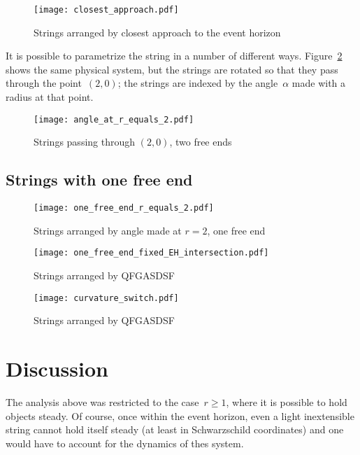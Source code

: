 \documentclass[prb,preprint]{revtex4-1}
\begin{document}
\begin{figure}[h!]
\centering
\texttt{[image: closest\_approach.pdf]}
\caption{Strings arranged by closest approach to the event horizon}
\label{closest_approach}
\end{figure}

It is possible to parametrize the string in a number of different
ways.  Figure~\ref{angle_at_r_equals_2} shows the same physical
system, but the strings are rotated so that they pass through the
point~$\left(2,0\right)$; the strings are indexed by the
angle~$\alpha$ made with a radius at that point.  

\begin{figure}[h!]
\centering
\texttt{[image: angle\_at\_r\_equals\_2.pdf]}
\caption{Strings \label{angle_at_r_equals_2} passing through $\left(2,0\right)$, two free ends}
\end{figure}

\subsection{Strings with one free end}


\begin{figure}[h!]
\centering
\texttt{[image: one\_free\_end\_r\_equals\_2.pdf]}
\caption{Strings arranged by angle made at $r=2$, one free end}
\label{y}
\end{figure}

\begin{figure}[h!]
\centering
\texttt{[image: one\_free\_end\_fixed\_EH\_intersection.pdf]}
\caption{Strings arranged by QFGASDSF}
\label{fixed_EH_intersection}
\end{figure}

\begin{figure}[h!]
\centering
\texttt{[image: curvature\_switch.pdf]}
\caption{Strings arranged by QFGASDSF}
\label{curvature_switch}
\end{figure}



\section{Discussion}


The analysis above was restricted to the case~$r\geq 1$, where it is
possible to hold objects steady.  Of course, once within the event
horizon, even a light inextensible string cannot hold itself steady
(at least in Schwarzschild coordinates) and one would have to account
for the dynamics of thes system.
\end{document}
